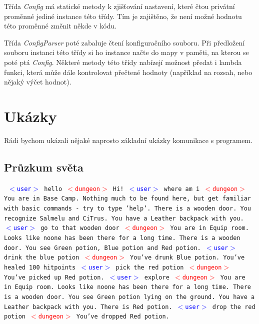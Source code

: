 \documentclass[11pt, a4paper]{article}
\def\class#1{\emph{#1}}
\newenvironment{example}%
{\smallskip\noindent\ignorespaces\obeylines\tt}%
{\smallskip\par\noindent
\ignorespacesafterend}
\def\user{\textcolor{blue}{$<$user$>$ }}
\def\dung{\textcolor{red}{$<$dungeon$>$ }}
\begin{document}
Třída \class{Config} má statické metody k zjišťování nastavení, které čtou privátní proměnné jediné instance této třídy. Tím je zajištěno, že není možné hodnotu této proměnné změnit někde v kódu. 

Třída \class{ConfigParser} poté zabaluje čtení konfiguračního souboru. Při předložení souboru instanci této třídy si ho instance načte do mapy v paměti, na kterou se poté ptá \class{Config}. Některé metody této třídy nabízejí možnost předat i lambda funkci, která může dále kontrolovat přečtené hodnoty (například na rozsah, nebo nějaký výčet hodnot).

\section{Ukázky}

Rádi bychom ukázali nějaké naprosto základní ukázky komunikace s programem.
\subsection{Průzkum světa}

\begin{example}
\user hello
\dung Hi!
\user where am i
\dung You are in Base Camp. Nothing much to be found here, but get
familiar with basic commands - try to type 'help'. There is a wooden
door. You recognize Salmelu and CiTrus. You have a Leather backpack 
with you.
\user go to that wooden door
\dung You are in Equip room. Looks like noone has been there for 
a long time. There is a wooden door. You see Green potion, Blue potion 
and Red potion. 
\user drink the blue potion
\dung You've drunk Blue potion. You've healed 100 hitpoints
\user pick the red potion
\dung You've picked up Red potion.
\user explore
\dung You are in Equip room. Looks like noone has been there for 
a long time. There is a wooden door. You see Green potion lying on the 
ground. You have a Leather backpack with you. There is Red potion.
\user drop the red potion
\dung You've dropped Red potion. 
\end{example}
\end{document}
